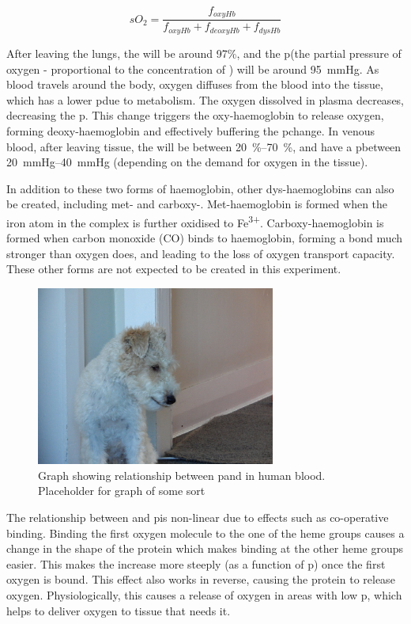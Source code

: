 \begin{equation}
sO_2 = \frac{f_{oxyHb}}{f_{oxyHb} + f_{deoxyHb} + f_{dysHb}}
\label{eq:o2sat}
\end{equation}

After leaving the lungs, the \SOtwo will be around 97\%, and the p\Otwo (the partial pressure of oxygen - proportional to the concentration of \Otwo) will be around \SI{95}{mmHg}.
As blood travels around the body, oxygen diffuses from the blood into the tissue, which has a lower p\Otwo due to metabolism.
The oxygen dissolved in plasma decreases, decreasing the p\Otwo.
This change triggers the oxy-haemoglobin to release oxygen, forming deoxy-haemoglobin and effectively buffering the p\Otwo change.
In venous blood, after leaving tissue, the \SOtwo will be between \SIrange{20}{70}{\percent}, and have a p\Otwo between \SIrange{20}{40}{mmHg} (depending on the demand for oxygen in the tissue).

In addition to these two forms of haemoglobin, other dys-haemoglobins can also be created, including met- and carboxy-.
Met-haemoglobin is formed when the iron atom in the complex is further oxidised to Fe\textsuperscript{3+}.
Carboxy-haemoglobin is formed when carbon monoxide (CO) binds to haemoglobin, forming a bond much stronger than oxygen does, and leading to the loss of oxygen transport capacity.
These other forms are not expected to be created in this experiment.

\begin{figure}
\centering
\includegraphics[width=0.7\textwidth]{figures/background/placeholder.JPG}
\caption{Graph showing relationship between p\Otwo and \SOtwo in human blood. Placeholder for graph of some sort}
\label{fig:back-po2so2}
\end{figure}

The relationship between \SOtwo and p\Otwo is non-linear due to effects such as co-operative binding.
Binding the first oxygen molecule to the one of the heme groups causes a change in the shape of the protein which makes binding at the other heme groups easier.
This makes the \SOtwo increase more steeply (as a function of p\Otwo) once the first oxygen is bound.
This effect also works in reverse, causing the protein to release oxygen.
Physiologically, this causes a release of oxygen in areas with low p\Otwo, which helps to deliver oxygen to tissue that needs it.

